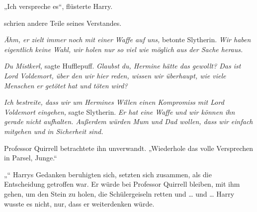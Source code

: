 „Ich verspreche es“, flüsterte Harry.

\emph{} schrien andere Teile seines Verstandes.

\emph{Ähm, er zielt immer noch mit einer Waffe auf uns,} betonte Slytherin. \emph{Wir haben eigentlich keine Wahl, wir holen nur so viel wie möglich aus der Sache heraus.}

\emph{Du Mistkerl,} sagte Hufflepuff. \emph{Glaubst du, Hermine hätte das gewollt? Das ist Lord Voldemort, über den wir hier reden, wissen wir überhaupt, wie viele Menschen er getötet hat und töten wird?}

\emph{Ich bestreite, dass wir um Hermines Willen einen Kompromiss mit Lord Voldemort eingehen,} sagte Slytherin. \emph{Er hat eine Waffe und wir können ihn gerade nicht aufhalten. Außerdem würden Mum und Dad wollen, dass wir einfach mitgehen und in Sicherheit sind.}

Professor Quirrell betrachtete ihn unverwandt.
„Wiederhole das volle Versprechen in Parsel, Junge.“

„“
Harrys Gedanken beruhigten sich, setzten sich zusammen, als die Entscheidung getroffen war. Er würde bei Professor Quirrell bleiben, mit ihm gehen, um den Stein zu holen, die Schülergeiseln retten und … und … Harry wusste es nicht, nur, dass er weiterdenken würde.

